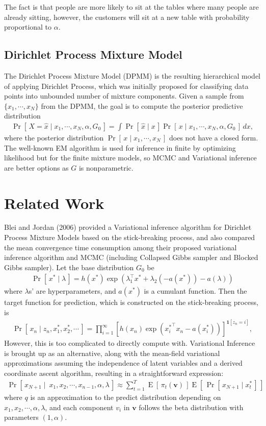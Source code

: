 \documentclass{article}
\newcommand{\prob}[1]{\operatorname{Pr}\left[\,#1\,\right]}
\newcommand{\expect}[1]{\operatorname{E}\left[\,#1\,\right]}
\def\cond{\; | \;}
\begin{document}
The fact is that people are more likely to sit at the tables where many people are already sitting, however,  the customers will sit at a new table with probability proportional to $\alpha$.\\

\subsection{Dirichlet Process Mixture Model}
The Dirichlet Process Mixture Model (DPMM) is the resulting hierarchical model of applying Dirichlet Process,  which was initially proposed for classifying data points into unbounded number of mixture components.  Given a sample from $\{x_1, \cdots, x_N\}$ from the DPMM,  the goal is to compute the posterior predictive distribution 
\begin{align*}
\prob{X = \hat{x}\cond x_1, \cdots, x_N, \alpha, G_0} = \int\prob{\hat{x}\cond x}\prob{x\cond x_1, \cdots, x_N, \alpha, G_0}\,dx,
\end{align*}
where the posterior distribution $\prob{x\cond x_1, \cdots, x_N}$ does not have a closed form.  The well-known EM algorithm is used for inference in finite by optimizing likelihood but for the finite mixture models,  so MCMC and Variational inference are better options as $G$ is nonparametric.

\section{Related Work}
Blei and Jordan (2006) provided a Variational inference algorithm for Dirichlet Process Mixture Models based on the stick-breaking process, and also compared the mean convergence time consumption among their proposed variational inference algorithm and MCMC (including Collapsed Gibbs sampler and Blocked Gibbs sampler).  Let the base distribution $G_0$ be
\begin{align*}
\prob{x^*\cond \lambda} = h(x^*)\exp(\lambda_1^\top x^* + \lambda_2(-a(x^*)) - a(\lambda))
\end{align*}
where $\lambda$s' are hyperparameters,  and $a(x^*)$ is a cumulant function.  Then the target function for prediction, which is constructed on the stick-breaking process, is 
\begin{align*}
\prob{x_n\cond z_n, x_1^*, x_2^*, \cdots} = \prod_{i=1}^\infty [h(x_n)\exp({x_i^*}^\top x_n - a(x_i^*))]^{\mathbf{1}[z_n = i]},
\end{align*}
However,  this is too complicated to directly compute with.  Variational Inference is brought up as an alternative,  along with the mean-field variational approximations assuming the independence of latent variables and a derived coordinate ascent algorithm,  resulting in a straightforward expression:
\begin{align*}
\prob{x_{N+1}\cond \ x_1, x_2, \cdots, x_{n-1}, \alpha, \lambda}\approx \sum_{t=1}^T \expect{\pi_t(\mathbf{v})}\expect{\prob{x_{N+1}\cond x_t^*}}
\end{align*}
where $q$ is an approximation to the predict distribution depending on $x_1, x_2, \cdots, \alpha, \lambda$,  and each component $v_i$ in $\mathbf{v}$ follows the beta distribution with parameters $(1, \alpha)$.
\end{document}
